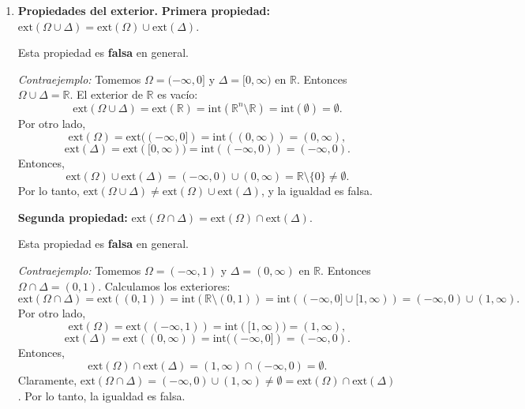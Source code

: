 \documentclass[12pt]{article}
\newcommand{\Ext}{\mathrm{ext}}
\newcommand{\Int}{\mathrm{int}}
\newcommand{\R}{\mathbb R}
\newcommand{\x}{\mathrm x}
\begin{document}
\begin{enumerate}
\begin{enumerate}[(1)]
($\supseteq$) Sea $\x \in \Int(\Omega) \cap \Int(\Delta)$. Entonces $\x \in \Int(\Omega)$ y $\x \in \Int(\Delta)$. Por lo tanto, existen $\varepsilon_1 > 0$ y $\varepsilon_2 > 0$ tales que $B(\x, \varepsilon_1) \subseteq \Omega$ y $B(\x, \varepsilon_2) \subseteq \Delta$. Sea $\varepsilon = \min\{\varepsilon_1, \varepsilon_2\} > 0$. Entonces $B(\x, \varepsilon) \subseteq B(\x, \varepsilon_1) \subseteq \Omega$ y $B(\x, \varepsilon) \subseteq B(\x, \varepsilon_2) \subseteq \Delta$. Por lo tanto, $B(\x, \varepsilon) \subseteq \Omega \cap \Delta$, lo que implica que $\x \in \Int(\Omega \cap \Delta)$.

Así, $\Int(\Omega\cap \Delta) = \Int(\Omega)\cap \Int(\Delta)$.

\item \textbf{Propiedades del exterior.}
\textbf{Primera propiedad:} $\Ext(\Omega\cup \Delta) = \Ext(\Omega)\cup \Ext(\Delta)$.

Esta propiedad es \textbf{falsa} en general.

\textit{Contraejemplo:} Tomemos $\Omega = (-\infty, 0]$ y $\Delta = [0, \infty)$ en $\R$. Entonces $\Omega \cup \Delta = \R$. El exterior de $\R$ es vacío:
\[
\Ext(\Omega \cup \Delta) = \Ext(\R) = \Int(\R^n \setminus \R) = \Int(\emptyset) = \emptyset.
\]
Por otro lado,
\[
\Ext(\Omega) = \Ext((-\infty, 0]) = \Int((0, \infty)) = (0, \infty),
\]
\[
\Ext(\Delta) = \Ext([0, \infty)) = \Int((-\infty, 0)) = (-\infty, 0).
\]
Entonces,
\[
\Ext(\Omega) \cup \Ext(\Delta) = (-\infty, 0) \cup (0, \infty) = \R \setminus \{0\} \neq \emptyset.
\]
Por lo tanto, $\Ext(\Omega\cup \Delta) \neq \Ext(\Omega)\cup \Ext(\Delta)$, y la igualdad es falsa.

\textbf{Segunda propiedad:} $\Ext(\Omega\cap \Delta) = \Ext(\Omega)\cap \Ext(\Delta)$.

Esta propiedad es \textbf{falsa} en general.

\textit{Contraejemplo:} Tomemos $\Omega = (-\infty, 1)$ y $\Delta = (0, \infty)$ en $\R$. Entonces $\Omega \cap \Delta = (0, 1)$. Calculamos los exteriores:
\[
\Ext(\Omega \cap \Delta) = \Ext((0,1)) = \Int(\R \setminus (0,1)) = \Int((-\infty, 0] \cup [1, \infty)) = (-\infty, 0) \cup (1, \infty).
\]
Por otro lado,
\[
\Ext(\Omega) = \Ext((-\infty, 1)) = \Int([1, \infty)) = (1, \infty),
\]
\[
\Ext(\Delta) = \Ext((0, \infty)) = \Int((-\infty, 0]) = (-\infty, 0).
\]
Entonces,
\[
\Ext(\Omega) \cap \Ext(\Delta) = (1, \infty) \cap (-\infty, 0) = \emptyset.
\]
Claramente, $\Ext(\Omega \cap \Delta) = (-\infty, 0) \cup (1, \infty) \neq \emptyset = \Ext(\Omega) \cap \Ext(\Delta)$. Por lo tanto, la igualdad es falsa.


\end{enumerate}
\end{enumerate}
\end{document}
